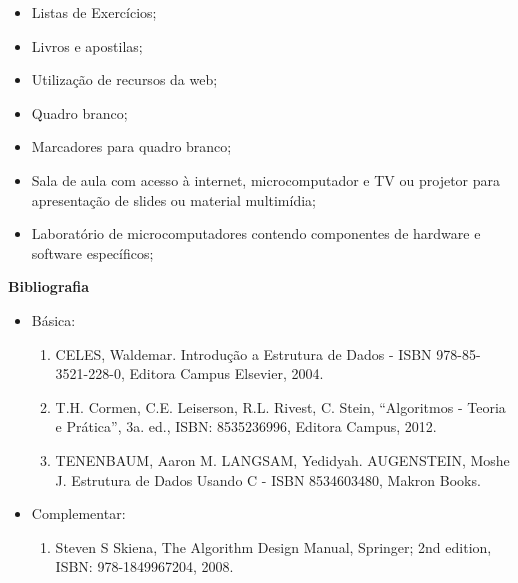 \begin{itemize} 
  \item Listas de Exercícios;
  \item Livros e apostilas;
  \item Utilização de recursos da web;
  \item Quadro branco;
  \item Marcadores para quadro branco;
  \item Sala de aula com acesso à internet, microcomputador e TV ou projetor para apresentação de slides ou material multimídia;
  \item Laboratório de microcomputadores contendo componentes de hardware e software específicos;
\end{itemize}


\begin{snugshade}\begin{center}\textbf{
    Bibliografia
}\end{center}\end{snugshade}

\begin{itemize} 
  \item Básica:
	\begin{enumerate}
	\item CELES, Waldemar. Introdução a Estrutura de Dados -  ISBN 978-85-3521-228-0, Editora Campus Elsevier, 2004.
	\item T.H. Cormen, C.E. Leiserson, R.L. Rivest, C. Stein, ``Algoritmos - Teoria e Prática'', 3a. ed., ISBN: 8535236996, Editora Campus, 2012.
	\item TENENBAUM, Aaron M. LANGSAM, Yedidyah. AUGENSTEIN, Moshe J. Estrutura de Dados Usando C - ISBN 8534603480, Makron Books. 
	
	\end{enumerate}
  \item Complementar:
	\begin{enumerate} 
	\item Steven S Skiena, The Algorithm Design Manual, Springer; 2nd edition, ISBN: 978-1849967204, 2008.\\
	\end{enumerate}
\end{itemize}
